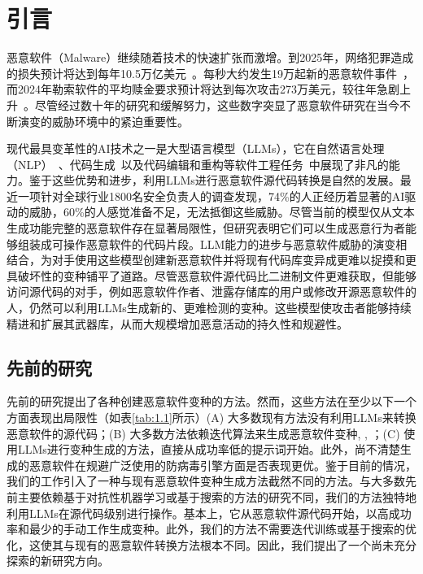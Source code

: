 
\chapter{引言}
恶意软件（Malware）继续随着技术的快速扩张而激增。到2025年，网络犯罪造成的损失预计将达到每年10.5万亿美元~\parencite{PIA2024}。每秒大约发生19万起新的恶意软件事件~\parencite{AVG2024}，而2024年勒索软件的平均赎金要求预计将达到每次攻击273万美元，较往年急剧上升~\parencite{Sophos2024}。尽管经过数十年的研究和缓解努力，这些数字突显了恶意软件研究在当今不断演变的威胁环境中的紧迫重要性。

现代最具变革性的AI技术之一是大型语言模型（LLMs），它在自然语言处理（NLP）~\parencite{Dubey2024,Kedia2021,Jiang2023}、代码生成~\parencite{Hou2023,MAI2024,Roziere2023,Zhu2024,Lozhkov2024,Huang2024}以及代码编辑和重构等软件工程任务~\parencite{Cassano2024,Guo2024,Cordeiro2024}中展现了非凡的能力。鉴于这些优势和进步，利用LLMs进行恶意软件源代码转换是自然的发展。最近一项针对全球行业1800名安全负责人的调查\parencite{Darktrace2024}发现，74\%的人正经历着显著的AI驱动的威胁，60\%的人感觉准备不足，无法抵御这些威胁。尽管当前的模型仅从文本生成功能完整的恶意软件存在显著局限性，但研究表明它们可以生成恶意行为者能够组装成可操作恶意软件的代码片段\parencite{Botacin2023}。LLM能力的进步与恶意软件威胁的演变相结合，为对手使用这些模型创建新恶意软件并将现有代码库变异成更难以捉摸和更具破坏性的变种铺平了道路。尽管恶意软件源代码比二进制文件更难获取，但能够访问源代码的对手，例如恶意软件作者、泄露存储库的用户或修改开源恶意软件的人，仍然可以利用LLMs生成新的、更难检测的变种。这些模型使攻击者能够持续精进和扩展其武器库，从而大规模增加恶意活动的持久性和规避性。

\section{先前的研究}
先前的研究提出了各种创建恶意软件变种的方法\parencite{Botacin2023,Qiao2022,Choi2019,Lucas2021,Ming2017,Ling2024,Digregorio2024}。然而，这些方法在至少以下一个方面表现出局限性（如表\ref{tab:1.1}所示）(A) 大多数现有方法没有利用LLMs来转换恶意软件的源代码\parencite{Qiao2022,Choi2019,Lucas2021,Ming2017,Ling2024,Digregorio2024}；(B) 大多数方法依赖迭代算法来生成恶意软件变种\parencite{Qiao2022,Choi2019,Lucas2021}, \parencite{Ling2024}, \parencite{Digregorio2024}；(C) 使用LLMs进行变种生成的方法，直接从成功率低的提示词开始\parencite{Botacin2023}。此外，尚不清楚生成的恶意软件在规避广泛使用的防病毒引擎方面是否表现更优。鉴于目前的情况，我们的工作引入了一种与现有恶意软件变种生成方法截然不同的方法。与大多数先前主要依赖基于对抗性机器学习或基于搜索的方法的研究不同，我们的方法独特地利用LLMs在源代码级别进行操作。基本上，它从恶意软件源代码开始，以高成功率和最少的手动工作生成变种。此外，我们的方法不需要迭代训练或基于搜索的优化，这使其与现有的恶意软件转换方法根本不同。因此，我们提出了一个尚未充分探索的新研究方向。

